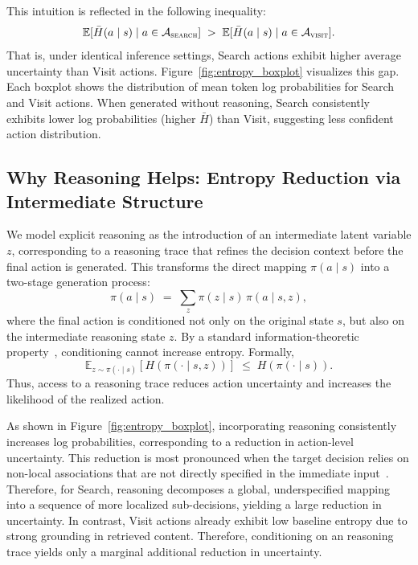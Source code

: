 This intuition is reflected in the following inequality:
\begin{equation}
    \mathbb{E}[\bar H(a\mid s)\mid a\in\mathcal{A}_{\textsc{search}}]
\;>\;
\mathbb{E}[\bar H(a\mid s)\mid a\in\mathcal{A}_{\textsc{visit}}].
\end{equation}
That is, under identical inference settings, Search actions exhibit higher average uncertainty than Visit actions.
Figure~\ref{fig:entropy_boxplot} visualizes this gap.
Each boxplot shows the distribution of mean token log probabilities for Search and Visit actions. 
When generated without reasoning, 
Search consistently exhibits lower log probabilities (higher $\bar{H}$) than Visit, suggesting less confident action distribution.


\subsection{Why Reasoning Helps: Entropy Reduction via Intermediate Structure}

We model explicit reasoning as the introduction of an intermediate latent variable $z$, corresponding to a reasoning trace that refines the decision context before the final action is generated.
This transforms the direct mapping $\pi(a \mid s)$ into a two-stage generation process:
\begin{equation}
\pi(a \mid s) \;=\; \sum_{z} \pi(z \mid s)\,\pi(a \mid s, z),
\label{eq:latent_factorization}
\end{equation}
where the final action is conditioned not only on the original state $s$, but also on the intermediate reasoning state $z$.
By a standard information-theoretic property~\cite{cover1999elements}, conditioning cannot increase entropy.
Formally,
\begin{equation}
\mathbb{E}_{z\sim \pi(\cdot\mid s)}\!\left[ H(\pi(\cdot \mid s, z)) \right] \;\le\; H(\pi(\cdot \mid s)).
\label{eq:entropy_reduction}
\end{equation}
Thus, access to a reasoning trace reduces action uncertainty and increases the likelihood of the realized action.


As shown in Figure~\ref{fig:entropy_boxplot}, incorporating reasoning consistently increases log probabilities, corresponding to a reduction in action-level uncertainty.
This reduction is most pronounced when the target decision relies on non-local associations that are not directly specified in the immediate input~\cite{prystawski2023think}.
Therefore, for Search, reasoning decomposes a global, underspecified mapping into a sequence of more localized sub-decisions, yielding a large reduction in uncertainty.
In contrast, Visit actions already exhibit low baseline entropy due to strong grounding in retrieved content.
Therefore, conditioning on an reasoning trace yields only a marginal additional reduction in uncertainty.


